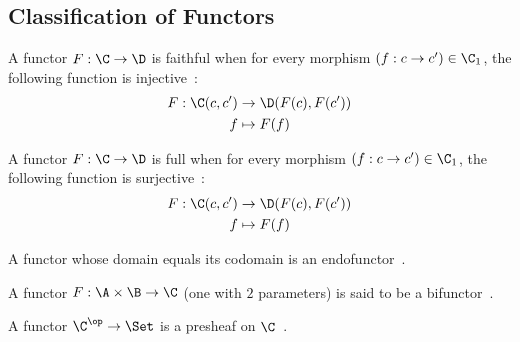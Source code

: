 \subsection{Classification of Functors}

\begin{definition}
  A functor $F:\C\to \D$ is faithful when for every morphism $(f: c\to c') \in
  \C_1$, the following function is
  injective~\parencite[p.~25]{leinster:basic_category_theory}:
    \[
      \begin{aligned}
        F: \C(c, c') &\to \D(F(c), F(c'))\\
        f &\mapsto F(f)
      \end{aligned}
    \]
\end{definition}

\begin{definition}
  A functor $F:\C\to \D$ is full when for every morphism $(f: c\to c') \in
  \C_1$, the following function is
  surjective~\parencite[p.~25]{leinster:basic_category_theory}:
  \[
    \begin{aligned}
      F: \C(c, c') &\to \D(F(c), F(c'))\\
      f &\mapsto F(f)
    \end{aligned}
  \]
\end{definition}

\begin{definition}[Endofunctor]
  A functor whose domain equals its codomain is an
  endofunctor~\parencite[p.~30]{adamek_herrlich_strecker:joy_cats}.
\end{definition}

\begin{definition}[Bifunctor]
  A functor $F:\A\times \B \to \C$ (one with $2$ parameters) is said to be a
  bifunctor~\parencite[p.~37]{lane:working_mathematician}.
\end{definition}

\begin{definition}[Presheaf]
  A functor $\C^\op \to \Set$ is a presheaf on
  $\C$~\parencite[p.~24]{leinster:basic_category_theory}.
\end{definition}

